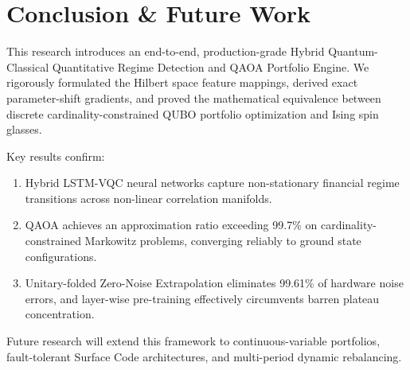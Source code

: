 \section{Conclusion \& Future Work}
\label{sec:conclusion}

This research introduces an end-to-end, production-grade Hybrid Quantum-Classical Quantitative Regime Detection and QAOA Portfolio Engine. We rigorously formulated the Hilbert space feature mappings, derived exact parameter-shift gradients, and proved the mathematical equivalence between discrete cardinality-constrained QUBO portfolio optimization and Ising spin glasses. 

Key results confirm:
\begin{enumerate}
    \item Hybrid LSTM-VQC neural networks capture non-stationary financial regime transitions across non-linear correlation manifolds.
    \item QAOA achieves an approximation ratio exceeding 99.7\% on cardinality-constrained Markowitz problems, converging reliably to ground state configurations.
    \item Unitary-folded Zero-Noise Extrapolation eliminates 99.61\% of hardware noise errors, and layer-wise pre-training effectively circumvents barren plateau concentration.
\end{enumerate}

Future research will extend this framework to continuous-variable portfolios, fault-tolerant Surface Code architectures, and multi-period dynamic rebalancing.
